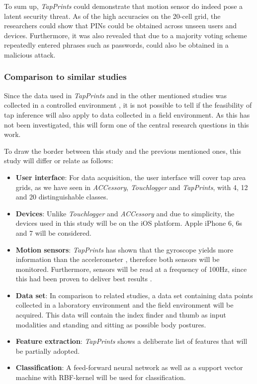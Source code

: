 To sum up, \textit{TapPrints} could demonstrate that motion sensor do indeed pose a latent security threat. As of the high accuracies on the 20-cell grid, the researchers could show that PINs could be obtained across unseen users and devices. Furthermore, it was also revealed that due to a majority voting scheme repeatedly entered phrases such as passwords, could also be obtained in a malicious attack.

\subsubsection{Comparison to similar studies}

Since the data used in \textit{TapPrints} and in the other mentioned studies was collected in a controlled environment \cite{Accessory,Touchlogger,Tapprints}, it is not possible to tell if the feasibility of tap inference will also apply to data collected in a field environment. As this has not been investigated, this will form one of the central research questions in this work.

To draw the border between this study and the previous mentioned ones, this study will differ or relate as follows:
\begin{itemize}
  \item \textbf{User interface}: For data acquisition, the user interface will cover tap area grids, as we have seen in \textit{ACCessory}, \textit{Touchlogger} and \textit{TapPrints}, with 4, 12 and 20 distinguishable classes.
  \item \textbf{Devices}: Unlike \textit{Touchlogger} and \textit{ACCessory} and due to simplicity, the devices used in this study will be on the iOS platform. Apple iPhone 6, 6s and 7 will be considered.
  \item \textbf{Motion sensors}: \textit{TapPrints} has shown that the gyroscope yields more information than the accelerometer \cite{Tapprints}, therefore both sensors will be monitored. Furthermore, sensors will be read at a frequency of 100Hz, since this had been proven to deliver best results \cite{Tapprints, Accessory}.
  \item \textbf{Data set}: In comparison to related studies, a data set containing data points collected in a laboratory environment and the field environment will be acquired. This data will contain the index finder and thumb as input modalities and standing and sitting as possible body postures.
  \item \textbf{Feature extraction}: \textit{TapPrints} shows a deliberate list of features \cite{Tapprints} that will be partially adopted.
  \item \textbf{Classification}: A feed-forward neural network as well as a support vector machine with RBF-kernel will be used for classification.
\end{itemize}

